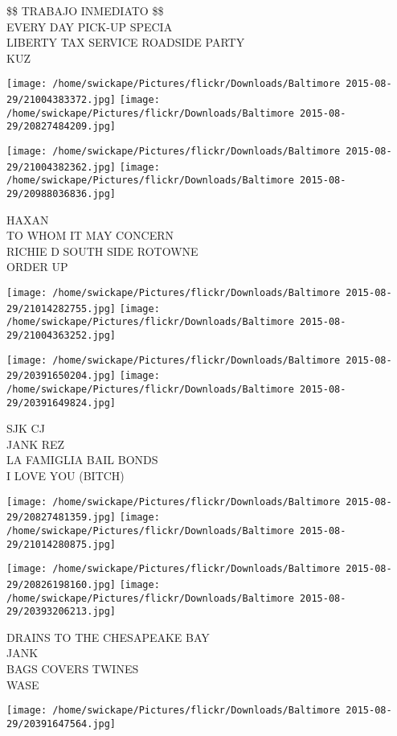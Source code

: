 \documentclass[10pt,letterpaper]{article}
\begin{document}
\$\$ TRABAJO INMEDIATO \$\$\\
EVERY DAY PICK{-}UP SPECIA\\
LIBERTY TAX SERVICE ROADSIDE PARTY\\
KUZ
\pagebreak

\texttt{[image: /home/swickape/Pictures/flickr/Downloads/Baltimore 2015-08-29/21004383372.jpg]}
\texttt{[image: /home/swickape/Pictures/flickr/Downloads/Baltimore 2015-08-29/20827484209.jpg]}

\texttt{[image: /home/swickape/Pictures/flickr/Downloads/Baltimore 2015-08-29/21004382362.jpg]}
\texttt{[image: /home/swickape/Pictures/flickr/Downloads/Baltimore 2015-08-29/20988036836.jpg]}

HAXAN\\
TO WHOM IT MAY CONCERN\\
RICHIE D SOUTH SIDE ROTOWNE\\
ORDER UP
\pagebreak

\texttt{[image: /home/swickape/Pictures/flickr/Downloads/Baltimore 2015-08-29/21014282755.jpg]}
\texttt{[image: /home/swickape/Pictures/flickr/Downloads/Baltimore 2015-08-29/21004363252.jpg]}

\texttt{[image: /home/swickape/Pictures/flickr/Downloads/Baltimore 2015-08-29/20391650204.jpg]}
\texttt{[image: /home/swickape/Pictures/flickr/Downloads/Baltimore 2015-08-29/20391649824.jpg]}

SJK CJ\\
JANK REZ\\
LA FAMIGLIA BAIL BONDS\\
I LOVE YOU (BITCH)
\pagebreak

\texttt{[image: /home/swickape/Pictures/flickr/Downloads/Baltimore 2015-08-29/20827481359.jpg]}
\texttt{[image: /home/swickape/Pictures/flickr/Downloads/Baltimore 2015-08-29/21014280875.jpg]}

\texttt{[image: /home/swickape/Pictures/flickr/Downloads/Baltimore 2015-08-29/20826198160.jpg]}
\texttt{[image: /home/swickape/Pictures/flickr/Downloads/Baltimore 2015-08-29/20393206213.jpg]}

DRAINS TO THE CHESAPEAKE BAY\\
JANK\\
BAGS COVERS TWINES\\
WASE
\pagebreak

\texttt{[image: /home/swickape/Pictures/flickr/Downloads/Baltimore 2015-08-29/20391647564.jpg]}
\end{document}
